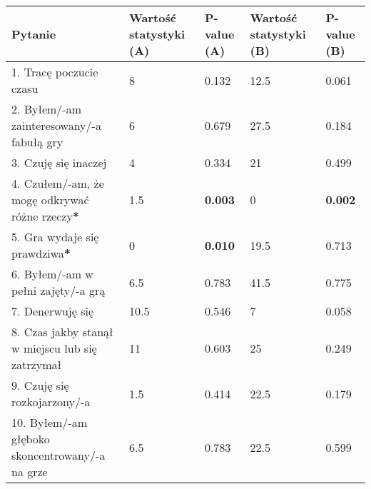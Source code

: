 \begin{table}[h!]
    \begin{center}
        \begin{tabular}{|m{10em}|m{5em}|m{5em}|m{5em}|m{5em}|}
            \hline
            Pytanie                                                           & Wartość statystyki (A) & P-value (A)    & Wartość statystyki (B) & P-value (B)    \\
            \hline
            1. Tracę poczucie czasu                                           & 8                      & 0.132          & 12.5                   & 0.061          \\
            2. Byłem/-am \newline zainteresowany/-a fabułą gry                & 6                      & 0.679          & 27.5                   & 0.184          \\
            3. Czuję się inaczej                                              & 4                      & 0.334          & 21                     & 0.499          \\
            4. Czułem/-am, że mogę odkrywać różne rzeczy\textbf{*}            & 1.5                    & \textbf{0.003} & 0                      & \textbf{0.002} \\
            5. Gra wydaje się prawdziwa\textbf{*}                             & 0                      & \textbf{0.010} & 19.5                   & 0.713          \\
            6. Byłem/-am \newline w pełni zajęty/-a grą                       & 6.5                    & 0.783          & 41.5                   & 0.775          \\
            7. Denerwuję się                                                  & 10.5                   & 0.546          & 7                      & 0.058          \\
            8. Czas jakby stanął w miejscu lub się zatrzymał                  & 11                     & 0.603          & 25                     & 0.249          \\
            9. Czuję się \newline rozkojarzony/-a                             & 1.5                    & 0.414          & 22.5                   & 0.179          \\
            10. Byłem/-am głęboko \newline skoncentrowany/-a \newline na grze & 6.5                    & 0.783          & 22.5                   & 0.599          \\

\end{tabular}
\end{center}
\end{table}
